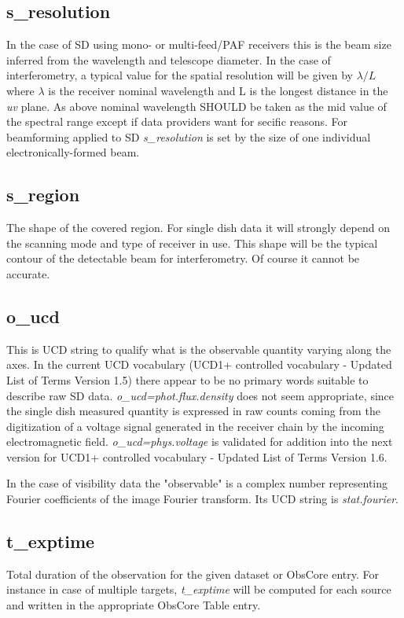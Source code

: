 \documentclass[11pt,a4paper]{ivoa}
\begin{document}
\subsection{s\_resolution}
\label{sec:res}
In the case of SD using mono- or multi-feed/PAF receivers this is the beam size inferred from the wavelength and telescope diameter.
In the case of interferometry, a typical value for the spatial resolution will be given by $\lambda / L$ where $\lambda$
is the %
receiver nominal wavelength and L is the longest distance in the \emph{uv} plane.
As above nominal wavelength SHOULD be taken as the mid value of the spectral range except if data providers want  
for secific reasons. 
For beamforming applied to SD \emph{s\_resolution} is set by the size of one individual electronically-formed beam.
 
\subsection{s\_region}
The shape of the covered region. 
For single dish data it will strongly depend on the scanning mode and type of receiver in use.
This shape will be the typical contour of the detectable beam for interferometry. Of course it cannot be accurate.

\subsection{o\_ucd}
This is UCD string  to qualify what is the observable quantity varying along the axes. 
In the current UCD vocabulary (UCD1+ controlled vocabulary - Updated List of Terms Version 1.5) there appear to be no primary words suitable to describe raw SD data. \emph{o\_ucd=phot.flux.density} does not seem appropriate, since the single dish measured quantity is expressed in raw counts coming from the digitization of a voltage signal generated in the receiver chain by the incoming electromagnetic field. 
\emph{o\_ucd=phys.voltage} is validated for addition into the next version for UCD1+ controlled vocabulary - Updated List of Terms Version 1.6.

In the case of visibility data the "observable" is a complex number representing Fourier
coefficients of the image Fourier transform. Its UCD string is \emph{stat.fourier}.

\subsection{t\_exptime}
Total duration of the observation for the given dataset or ObsCore entry. For instance  in case of multiple targets, \emph{t\_exptime}
will be computed for each source and written in the appropriate ObsCore Table entry.
\end{document}
